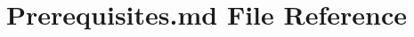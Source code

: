 \hypertarget{_prerequisites_8md}{\section{Prerequisites.\-md File Reference}
\label{_prerequisites_8md}
}
